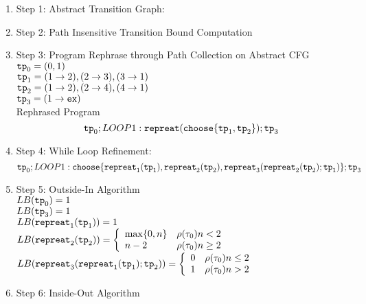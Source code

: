     \begin{enumerate}
      \item Step 1: Abstract Transition Graph:
    
    \item Step 2: Path Insensitive Transition Bound Computation
    
    \item Step 3: Program Rephrase through Path Collection on Abstract CFG
    \\
    $\mathtt{tp}_0 = (0, 1)$
    \\
    $\mathtt{tp}_1 = (1 \to 2), (2 \to 3), (3 \to 1)$
    \\
    $\mathtt{tp}_2 = (1 \to 2), (2 \to 4), (4 \to 1)$
    \\
    $\mathtt{tp}_3 = (1 \to \mathtt{ex})$
    \\
    Rephrased Program
    \[
    \mathtt{tp}_0 ; LOOP1: \mathtt{repreat}(\mathtt{choose}\{\mathtt{tp}_1, \mathtt{tp}_2 \}); \mathtt{tp}_3
    \]
    \item Step 4: While Loop Refinement:
    \[
      \mathtt{tp}_0 ; 
      LOOP1: \mathtt{choose}\{\mathtt{repreat}_1(\mathtt{tp}_1), \mathtt{repreat}_2(\mathtt{tp}_2),
      \mathtt{repreat}_3(\mathtt{repreat}_2(\mathtt{tp}_2); \mathtt{tp}_1)\}; \mathtt{tp}_3
      \]
    \item Step 5: Outside-In Algorithm
    \\
    $LB(\mathtt{tp}_0) = 1$
    \\
    $LB(\mathtt{tp}_3) = 1$
    \\
    $LB(\mathtt{repreat}_1(\mathtt{tp}_1)) = 1 $
    \\
    $LB(\rprepeat_2(\tpath_2)) = 
    \left\{
      \begin{array}{ll}
      \max\{0, n\} & \env(\trace_0) n < 2 \\
      n - 2 & \env(\trace_0)  n \geq 2
      \end{array} 
    \right.$
    \\
    $LB(\rprepeat_3(\rprepeat_1(\tpath_1); \tpath_2)) = 
    \left\{
      \begin{array}{ll}
      0 & \env(\trace_0) n \leq 2 \\
      1 & \env(\trace_0)  n > 2
      \end{array} 
    \right.$
    \\
    \item Step 6: Inside-Out Algorithm
    \begin{itemize}

\end{itemize}
\end{enumerate}

